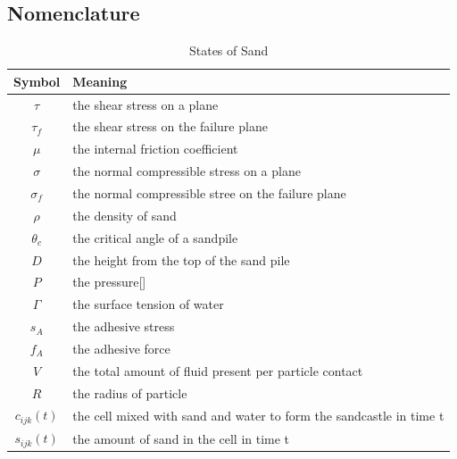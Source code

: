 \documentclass[12pt]{article}
\begin{document}
\subsection{Nomenclature}
\begin{table}[H]
    \caption{States of Sand}
    \vspace{5pt}
    \centering
    \begin{tabular}{cl}
        \hline
        Symbol       & Meaning                                                             \\
        \hline
        $\tau$       & the shear stress on a plane                                         \\
        $\tau_f$     & the shear stress on the failure plane                               \\
        $\mu$        & the internal friction coefficient                                   \\
        $\sigma$     & the normal compressible stress on a plane                           \\
        $\sigma_f$   & the normal compressible stree on the failure plane                  \\
        $\rho$       & the density of sand                                                 \\
        $\theta_c$   & the critical angle of a sandpile                                    \\
        $D$          & the height from the top of the sand pile                            \\
        $P$          & the pressure[]                                                      \\
        $\Gamma$     & the surface tension of water                                        \\
        $s_A$        & the adhesive stress                                                 \\
        $f_A$        & the adhesive force                                                  \\
        $V$          & the total amount of fluid present per particle contact              \\
        $R$          & the radius of particle                                              \\
        $c_{ijk}(t)$ & the cell mixed with sand and water to form the sandcastle in time t \\
        $s_{ijk}(t)$ & the amount of sand in the cell in time t                            \\

\end{tabular}
\end{table}
\end{document}

